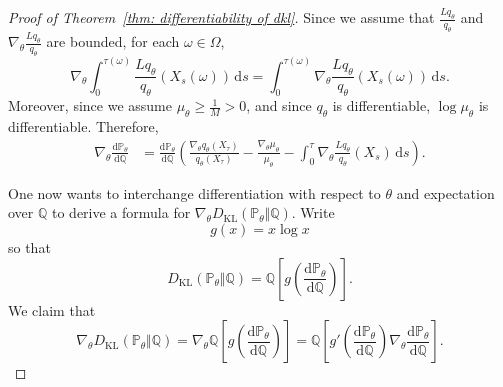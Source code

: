 \documentclass[reqno]{amsart}
\newcommand{\1}{\mathds{1}}
\renewcommand{\d}{\mathrm{d}}
\newcommand{\grad}{\nabla}
\renewcommand{\P}{\mathds{P}}
\newcommand{\Q}{\mathds{Q}}
\newcommand{\dkl}{D_{\mathrm{KL}}}
\theoremstyle{definition}
\theoremstyle{remark}
\begin{document}
\begin{proof}[Proof of Theorem~\ref{thm: differentiability of dkl}]
  Since we assume that $\frac{L q_\theta}{q_\theta}$ and $\grad_\theta\frac{L q_\theta}{q_\theta}$ are bounded, for each $\omega \in \Omega$,
  \begin{equation*}
    \grad_\theta \int_0^{\tau(\omega)} \frac{L q_\theta}{q_\theta}(X_s(\omega)) \, \d s =  \int_0^{\tau(\omega)} \grad_\theta \frac{L q_\theta}{q_\theta}(X_s(\omega)) \, \d s . 
  \end{equation*}
  Moreover, since we assume $\mu_\theta \geq \frac{1}{M} >0$, and since $q_\theta$ is differentiable, $\log \mu_\theta$ is differentiable. 
  Therefore, 
  \begin{align}
    \grad_\theta  \frac{\d \P_\theta}{\d \Q} &=  \frac{\d \P_\theta}{\d \Q} \left ( \frac{\grad_\theta q_\theta (X_\tau)}{q_\theta(X_\tau)} - \frac{\grad_\theta \mu_\theta}{\mu_\theta} - \int_0^\tau \grad_\theta \frac{L q_\theta}{q_\theta}(X_s) \, \d s\right ). \label{eq: derivative of integrand in dkl}                                               
  \end{align}
  

  One now wants to interchange differentiation with respect to $\theta$ and expectation over $\Q$ to derive a formula for $\grad_\theta \dkl ( \P_\theta \Vert \Q)$. Write
  \begin{equation*}
    g(x) = x \log x
  \end{equation*}
  so that
  \begin{equation*}
    \dkl ( \P_\theta \Vert \Q ) = \Q \left [ g \left (  \frac{\d \P_\theta}{\d \Q} \right ) \right ].
  \end{equation*}
  We claim that
  \begin{equation}\label{eq: first formula for derivative}
    \grad_\theta \dkl ( \P_\theta \Vert \Q) = \grad_\theta  \Q \left [ g \left (  \frac{\d \P_\theta}{\d \Q} \right ) \right ] = \Q \left [ g' \left (  \frac{\d \P_\theta}{\d \Q} \right ) \grad_\theta \frac{\d \P_\theta}{\d \Q} \right ].
  \end{equation}


\end{proof}
\end{document}
